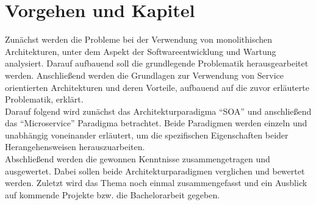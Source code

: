 \section{Vorgehen und Kapitel}
\label{sec:vorgehen}
Zunächst werden die Probleme bei der Verwendung von monolithischen Architekturen, unter dem Aspekt der Softwareentwicklung und Wartung analysiert. Darauf aufbauend soll die grundlegende Problematik herausgearbeitet werden. Anschließend werden die Grundlagen zur Verwendung von Service orientierten Architekturen und deren Vorteile, aufbauend auf die zuvor erläuterte Problematik, erklärt.
\\
Darauf folgend wird zunächst das Architekturparadigma "`SOA"' und anschließend das "`Microservice"' Paradigma betrachtet. Beide Paradigmen werden einzeln und unabhängig voneinander erläutert, um die spezifischen Eigenschaften beider Herangehensweisen herauszuarbeiten.
\\
Abschließend werden die gewonnen Kenntnisse zusammengetragen und ausgewertet. Dabei sollen beide Architekturparadigmen verglichen und bewertet werden. Zuletzt wird das Thema noch einmal zusammengefasst und ein Ausblick auf kommende Projekte bzw. die Bachelorarbeit gegeben.
